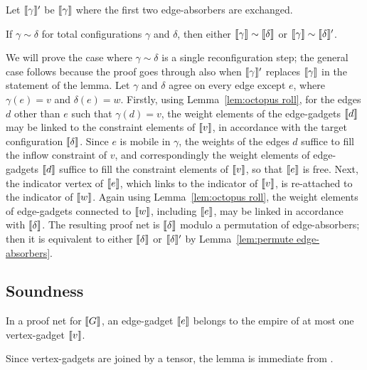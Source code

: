 \documentclass[conference]{IEEEtran}
\begin{document}
Let $\llbracket\gamma\rrbracket'$ be $\llbracket\gamma\rrbracket$ where the first two edge-absorbers are exchanged.

\begin{lemma}
If $\gamma\sim\delta$ for total configurations $\gamma$ and $\delta$, then either $\llbracket\gamma\rrbracket\sim\llbracket\delta\rrbracket$ or $\llbracket\gamma\rrbracket\sim\llbracket\delta\rrbracket'$.
\end{lemma}

\begin{IEEEproof}
We will prove the case where $\gamma\sim\delta$ is a single reconfiguration step; the general case follows because the proof goes through also when $\llbracket\gamma\rrbracket'$ replaces $\llbracket\gamma\rrbracket$ in the statement of the lemma.
%
Let $\gamma$ and $\delta$ agree on every edge except $e$, where $\gamma(e)=v$ and $\delta(e)=w$.
%
Firstly, using Lemma~\ref{lem:octopus roll}, for the edges $d$ other than $e$ such that $\gamma(d)=v$, the weight elements of the edge-gadgets $\llbracket d\rrbracket$ may be linked to the constraint elements of $\llbracket v\rrbracket$, in accordance with the target configuration $\llbracket\delta\rrbracket$.
%
Since $e$ is mobile in $\gamma$, the weights of the edges $d$ suffice to fill the inflow constraint of $v$, and correspondingly the weight elements of edge-gadgets $\llbracket d\rrbracket$ suffice to fill the constraint elements of $\llbracket v\rrbracket$, so that $\llbracket e\rrbracket$ is free.
%
Next, the indicator vertex of $\llbracket e\rrbracket$, which links to the indicator of $\llbracket v\rrbracket$, is re-attached to the indicator of $\llbracket w\rrbracket$.
%
Again using Lemma~\ref{lem:octopus roll}, the weight elements of edge-gadgets connected to $\llbracket w\rrbracket$, including $\llbracket e\rrbracket$, may be linked in accordance with $\llbracket\delta\rrbracket$.
%
The resulting proof net is $\llbracket\delta\rrbracket$ modulo a permutation of edge-absorbers; then it is equivalent to either $\llbracket\delta\rrbracket$ or $\llbracket\delta\rrbracket'$ by Lemma~\ref{lem:permute edge-absorbers}.
\end{IEEEproof}



\subsection*{Soundness}


\begin{lemma}
In a proof net for $\llbracket G\rrbracket$, an edge-gadget $\llbracket e\rrbracket$ belongs to the empire of at most one vertex-gadget $\llbracket v\rrbracket$.
\end{lemma}

\begin{IEEEproof}
Since vertex-gadgets are joined by a tensor, the lemma is immediate from \cite[Proposition 1]{Bellin-vandeWiele-1995}.
\end{IEEEproof}
\end{document}
